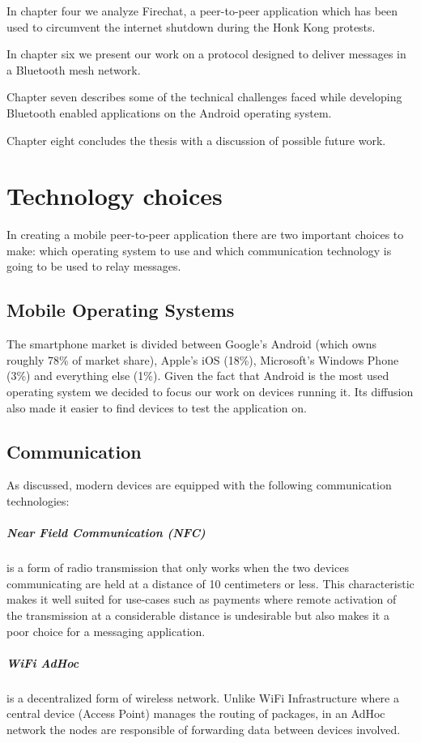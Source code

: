 In chapter four we analyze Firechat, a peer-to-peer application which has been used to circumvent the internet shutdown during the Honk Kong protests.

In chapter six we present our work on a protocol designed to deliver messages in a Bluetooth mesh network.

Chapter seven describes some of the technical challenges faced while developing Bluetooth enabled applications on the Android operating system.

Chapter eight concludes the thesis with a discussion of possible future work.

\chapter{Technology choices}
In creating a mobile peer-to-peer application there are two important choices to make: which operating system to use and which communication technology is going to be used to relay messages.

\section{Mobile Operating Systems}
The smartphone market is divided between Google's Android (which owns roughly 78\% of market share), Apple's iOS (18\%), Microsoft's Windows Phone (3\%) and everything else (1\%).
Given the fact that Android is the most used operating system we decided to focus our work on devices running it.
Its diffusion also made it easier to find devices to test the application on.

\section{Communication}
As discussed, modern devices are equipped with the following communication technologies:

\paragraph{Near Field Communication (NFC)}
is a form of radio transmission that only works when the two devices communicating are held at a distance of 10 centimeters or less. 
This characteristic makes it well suited for use-cases such as payments where remote activation of the transmission at a considerable distance is undesirable but also makes it a poor choice for a messaging application.

\paragraph{WiFi AdHoc} 
is a decentralized form of wireless network. Unlike WiFi Infrastructure where a central device (Access Point) manages the routing of packages, in an AdHoc network the nodes are responsible of forwarding data between devices involved.

